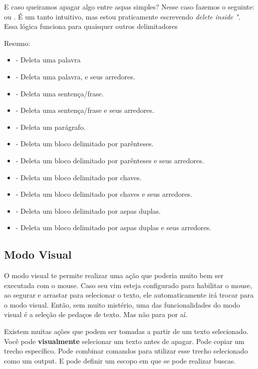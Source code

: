 \documentclass[a4paper, 12pt]{article}
\begin{document}
E caso queiramos apagar algo entre aspas simples? Nesse caso fazemos o seguinte:
 ou .
É um tanto intuitivo, mas estou praticamente escrevendo \textit{delete inside "}.
Essa lógica funciona para quaisquer outros delimitadores

Resumo:
\begin{itemize}
    \item {} - Deleta uma palavra
    \item {} - Deleta uma palavra, e seus arredores.
    \item {} - Deleta uma sentença/frase.
    \item {} - Deleta uma sentença/frase e seus arredores.
    \item {} - Deleta um parágrafo.
    \item {} - Deleta um bloco delimitado por parênteses.
    \item {} - Deleta um bloco delimitado por parênteses e seus arredores.
    \item {} - Deleta um bloco delimitado por chaves.
    \item {} - Deleta um bloco delimitado por chaves e seus arredores.
    \item {} - Deleta um bloco delimitado por aspas duplas.
    \item {} - Deleta um bloco delimitado por aspas duplas e seus arredores.
\end{itemize}


\subsection{Modo Visual}
O modo visual te permite realizar uma ação que poderia muito bem ser executada com o mouse.
Caso seu vim esteja configurado para habilitar o mouse, ao segurar e arrastar para selecionar o texto, ele automaticamente irá trocar para o modo visual.
Então, sem muito mistério, uma das funcionalidades do modo visual é a seleção de pedaços de texto. Mas não para por aí.

Existem muitas ações que podem ser tomadas a partir de um texto selecionado. Você pode \textbf{visualmente} selecionar um texto antes de apagar.
Pode copiar um trecho específico.
Pode combinar comandos para utilizar esse trecho selecionado como um output.
E pode definir um escopo em que se pode realizar buscas.
\end{document}
